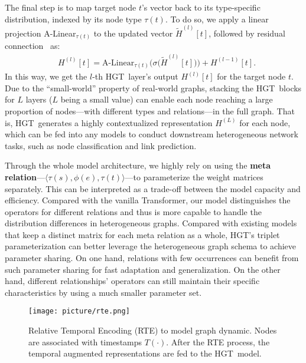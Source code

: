 \documentclass[sigconf]{acmart}
\theoremstyle{definition}
\newcommand{\short}{HGT}
\begin{document}
The final step is to map target node $t$'s vector back to its type-specific distribution, indexed by its node type $\tau(t)$. 
To do so, we apply a linear projection A-Linear$_{\tau(t)}$ to the updated vector $\widetilde{H}^{(l)}[t]$, followed by residual connection~\cite{DBLP:conf/cvpr/HeZRS16} as:
\begin{align}
&H^{(l)}[t] = \text{A-Linear}_{\tau(t)}\Big(\sigma\big(\widetilde{H}^{(l)}[t]\big)\Big) + H^{(l-1)}[t]. \label{eq:output} 
\end{align}
In this way, we get the $l$-th \short\ layer's output $H^{(l)}[t]$ for the target node $t$. 
Due to the ``small-world'' property of real-world graphs, stacking the \short\ blocks for $L$ layers ($L$ being a small value) can enable each node reaching  a large proportion of nodes---with different types and relations---in the full graph. 
That is, \short\ generates a highly contextualized representation $H^{(L)}$ for each node, which can be fed into any models to conduct downstream heterogeneous network tasks, such as node classification and link prediction. 

Through the whole model architecture, we highly rely on using the \textbf{meta relation}---$\langle \tau(s), \phi(e), \tau(t) \rangle$---to parameterize the weight matrices separately. 
This can be interpreted as a trade-off between the model capacity and efficiency. Compared with the vanilla Transformer, our model distinguishes the operators for different relations and thus is more capable to handle the distribution differences in heterogeneous graphs. 
Compared with existing models that keep a distinct matrix for each meta relation as a whole, \short's triplet parameterization can better leverage the heterogeneous graph schema to achieve parameter sharing. 
On one hand, relations with few occurrences can benefit from such parameter sharing for fast adaptation and generalization. 
On the other hand, different relationships' operators can still maintain their specific characteristics by using a much smaller parameter set. 






\begin{figure}[t!]
    \centering
    \texttt{[image: picture/rte.png]}
    \caption{Relative Temporal Encoding (RTE) to model graph dynamic. \textmd{Nodes  are associated with timestamps $T(\cdot)$. After the RTE process, the temporal augmented representations are fed to the \short\ model.}}
    \label{fig:rte}
\end{figure} 
\end{document}
